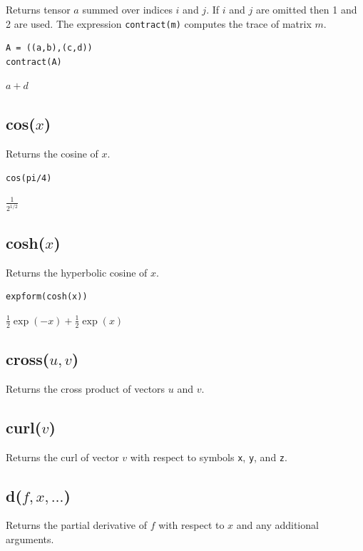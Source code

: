 \documentclass[12pt]{article}
\begin{document}
Returns tensor $a$ summed over indices $i$ and $j$.
If $i$ and $j$ are omitted then 1 and 2 are used.
The expression {\tt contract(m)} computes the trace of matrix $m$.

{\color{blue}
\begin{verbatim}
A = ((a,b),(c,d))
contract(A)
\end{verbatim}
}

\noindent
$a + d$

\subsection*{cos($x$)}

Returns the cosine of $x$.

{\color{blue}
\begin{verbatim}
cos(pi/4)
\end{verbatim}
}

\noindent
$\displaystyle \frac{1}{2^{1/2}}$

\subsection*{cosh($x$)}

Returns the hyperbolic cosine of $x$.

{\color{blue}
\begin{verbatim}
expform(cosh(x))
\end{verbatim}
}

\noindent
$\tfrac{1}{2}\exp(-x)+\tfrac{1}{2}\exp(x)$

\subsection*{cross($u,v$)}

Returns the cross product of vectors $u$ and $v$.

\subsection*{curl($v$)}

Returns the curl of vector $v$ with respect to symbols \verb$x$, \verb$y$, and \verb$z$.

\subsection*{d($f,x,\ldots$)}

Returns the partial derivative of $f$ with respect to $x$ and any additional arguments.
\end{document}

